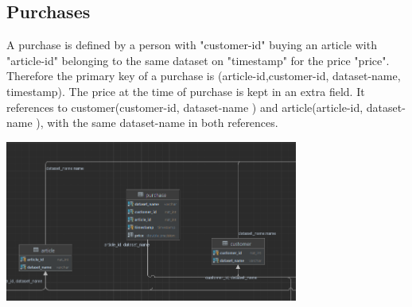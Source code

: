 \documentclass[a4paper,12pt]{article}
\begin{document}
	\subsection{Purchases}
	A purchase is defined by a person with "customer-id" buying an article with "article-id" belonging to the same dataset on "timestamp" for the price "price". Therefore the primary key of a purchase is (article-id,customer-id, dataset-name, timestamp). The price at the time of purchase is kept in an extra field. It references to customer(customer-id, dataset-name ) and article(article-id, dataset-name ), with the same dataset-name in both references.
		\begin{center}
		  		\includegraphics[height={200px},width=\textwidth,keepaspectratio,width=\textwidth,keepaspectratio ]{Purchase.png}
	\end{center}
	\pagebreak	
\end{document}
